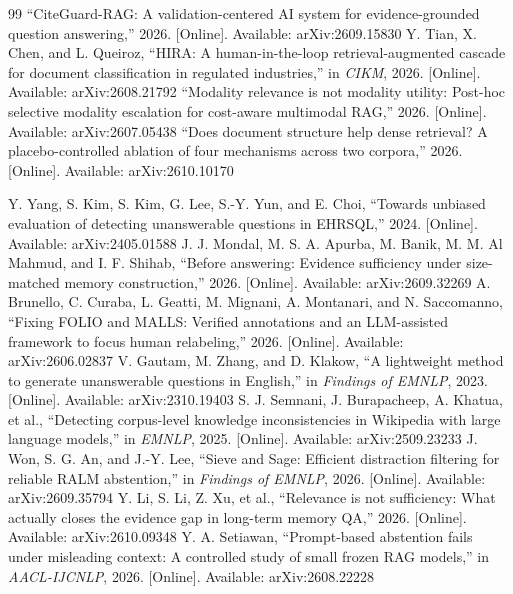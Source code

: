\documentclass[preprint,3p,times]{elsarticle}
\begin{document}
\begin{thebibliography}{99}
 ``CiteGuard-RAG: A validation-centered AI system for evidence-grounded question answering,'' 2026. [Online]. Available: arXiv:2609.15830
 Y. Tian, X. Chen, and L. Queiroz, ``HIRA: A human-in-the-loop retrieval-augmented cascade for document classification in regulated industries,'' in \emph{CIKM}, 2026. [Online]. Available: arXiv:2608.21792
 ``Modality relevance is not modality utility: Post-hoc selective modality escalation for cost-aware multimodal RAG,'' 2026. [Online]. Available: arXiv:2607.05438
 ``Does document structure help dense retrieval? A placebo-controlled ablation of four mechanisms across two corpora,'' 2026. [Online]. Available: arXiv:2610.10170

 Y. Yang, S. Kim, S. Kim, G. Lee, S.-Y. Yun, and E. Choi, ``Towards unbiased evaluation of detecting unanswerable questions in EHRSQL,'' 2024. [Online]. Available: arXiv:2405.01588
 J. J. Mondal, M. S. A. Apurba, M. Banik, M. M. Al Mahmud, and I. F. Shihab, ``Before answering: Evidence sufficiency under size-matched memory construction,'' 2026. [Online]. Available: arXiv:2609.32269
 A. Brunello, C. Curaba, L. Geatti, M. Mignani, A. Montanari, and N. Saccomanno, ``Fixing FOLIO and MALLS: Verified annotations and an LLM-assisted framework to focus human relabeling,'' 2026. [Online]. Available: arXiv:2606.02837
 V. Gautam, M. Zhang, and D. Klakow, ``A lightweight method to generate unanswerable questions in English,'' in \emph{Findings of EMNLP}, 2023. [Online]. Available: arXiv:2310.19403
 S. J. Semnani, J. Burapacheep, A. Khatua, et al., ``Detecting corpus-level knowledge inconsistencies in Wikipedia with large language models,'' in \emph{EMNLP}, 2025. [Online]. Available: arXiv:2509.23233
 J. Won, S. G. An, and J.-Y. Lee, ``Sieve and Sage: Efficient distraction filtering for reliable RALM abstention,'' in \emph{Findings of EMNLP}, 2026. [Online]. Available: arXiv:2609.35794
 Y. Li, S. Li, Z. Xu, et al., ``Relevance is not sufficiency: What actually closes the evidence gap in long-term memory QA,'' 2026. [Online]. Available: arXiv:2610.09348
 Y. A. Setiawan, ``Prompt-based abstention fails under misleading context: A controlled study of small frozen RAG models,'' in \emph{AACL-IJCNLP}, 2026. [Online]. Available: arXiv:2608.22228

\end{thebibliography}
\end{document}
